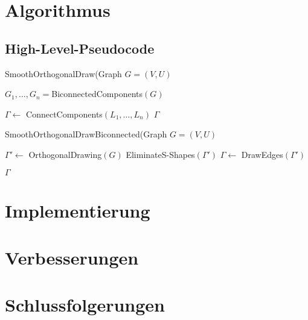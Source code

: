 \documentclass[a4paper]{scrreprt}
\theoremstyle{definition}
\begin{document}
\chapter{Algorithmus}

\section{High-Level-Pseudocode}


\begin{algorithm}[ht]
  \caption{SmoothOrthogonalDraw(Graph $G = (V,U)$}
  \label{alg:main}
  
  $G_1, \dots, G_n = $BiconnectedComponents$(G)$ \;
  
  $\Gamma \leftarrow$ ConnectComponents$(L_1, \dots, L_n)$ \;
  \Return $\Gamma$
\end{algorithm}

\begin{algorithm}[ht]
  \caption{SmoothOrthogonalDrawBiconnected(Graph $G = (V,U)$}
  \label{alg:biconnected}
  
  $\Gamma' \leftarrow$ OrthogonalDrawing$(G)$ \;
  EliminateS-Shapes$(\Gamma')$ \;
  $\Gamma \leftarrow$ DrawEdges$(\Gamma')$ \;
  
  \Return $\Gamma$
\end{algorithm}


\chapter{Implementierung}

\chapter{Verbesserungen}

\chapter{Schlussfolgerungen}








\end{document}
